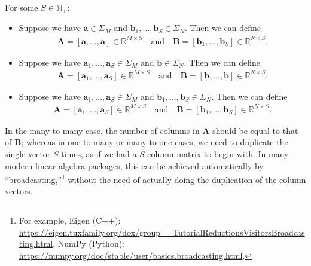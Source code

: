\begin{definition}
  For some $S \in \mathbb{N}_+$:
  \begin{itemize}
    \item Suppose we have $\mathbf{a} \in \Sigma_M$ and $\mathbf{b}_1, \ldots, \mathbf{b}_S \in \Sigma_N$.
          Then we can define
          \begin{equation*}
            \begin{aligned}
              \mathbf{A} = \left[\mathbf{a}, \ldots, \mathbf{a}\right] \in \mathbb{R}^{M \times S}
              \quad\text{and}\quad
              \mathbf{B} = \left[\mathbf{b}_1, \ldots, \mathbf{b}_S \right] \in \mathbb{R}^{N \times S}.
            \end{aligned}
          \end{equation*}
    \item Suppose we have $\mathbf{a}_1, \ldots, \mathbf{a}_S \in \Sigma_M$ and $\mathbf{b} \in \Sigma_N$.
          Then we can define
          \begin{equation*}
            \begin{aligned}
              \mathbf{A} = \left[\mathbf{a}_1, \ldots, \mathbf{a}_S\right] \in \mathbb{R}^{M \times S}
              \quad\text{and}\quad
              \mathbf{B} = \left[\mathbf{b}, \ldots, \mathbf{b} \right] \in \mathbb{R}^{N \times S}.
            \end{aligned}
          \end{equation*}
    \item Suppose we have $\mathbf{a}_1, \ldots, \mathbf{a}_S \in \Sigma_M$ and $\mathbf{b}_1, \ldots, \mathbf{b}_S \in \Sigma_N$.
          Then we can define
          \begin{equation*}
            \begin{aligned}
              \mathbf{A} = \left[\mathbf{a}_1, \ldots, \mathbf{a}_S\right] \in \mathbb{R}^{M \times S}
              \quad\text{and}\quad
              \mathbf{B} = \left[\mathbf{b}_1, \ldots, \mathbf{b}_S \right] \in \mathbb{R}^{N \times S}.
            \end{aligned}
          \end{equation*}
  \end{itemize}
\end{definition}

\begin{remark}[]
  In the many-to-many case, the number of columns in $\mathbf{A}$ should be equal to that of $\mathbf{B}$;
  whereas in one-to-many or many-to-one cases, we need to duplicate the single vector $S$ times,
  as if we had a $S$-column matrix to begin with.
  In many modern linear algebra packages, this can be achieved automatically by ``broadcasting,''\footnote{
    For example,
    Eigen (C++): \url{https://eigen.tuxfamily.org/dox/group__TutorialReductionsVisitorsBroadcasting.html},
    NumPy (Python): \url{https://numpy.org/doc/stable/user/basics.broadcasting.html}.
  }
  without the need of actually doing the duplication of the column vectors.
\end{remark}

